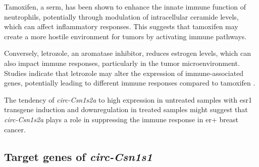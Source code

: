 Tamoxifen, a \gls{serm}, has been shown to enhance the innate immune function
of neutrophils, potentially through modulation of intracellular ceramide
levels, which can affect inflammatory
responses\supercite{corriden_tamoxifen_2015}.
This suggests that tamoxifen may create a more hostile environment for tumors
by activating immune pathways.

Conversely, letrozole, an aromatase inhibitor, reduces estrogen levels, which
can also impact immune responses, particularly in the tumor microenvironment.
Studies indicate that letrozole may alter the expression of immune-associated
genes, potentially leading to different immune responses compared to tamoxifen
\supercite{dabydeen_comparison_2015}.

The tendency of \textit{circ-Csn1s2a} to high expression in untreated
samples with \gls{esr1} transgene induction and downregulation in treated
samples might suggest that \textit{circ-Csn1s2a} plays a role in suppressing
the immune response in \gls{er+} breast cancer.

\subsection{Target genes of \textit{circ-Csn1s1}}

